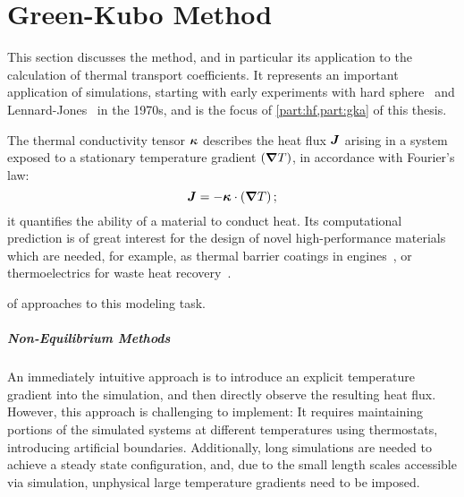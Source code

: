 
\chapter{Green-Kubo Method}
\label{ch:gk}

\noindent
This section discusses the  method, and in particular its application to the calculation of thermal transport coefficients. It represents an important application of \md simulations, starting with early experiments with hard sphere~\cite{agw1970t} and Lennard-Jones~\cite{v1967p} \ffs in the 1970s, and is the focus of \cref{part:hf,part:gka} of this thesis.

The thermal conductivity tensor $\boldsymbol{\kappa}$ describes the heat flux $\boldsymbol{J}$ arising in a system exposed to a stationary temperature gradient $(\boldsymbol{\nabla} T)$, in accordance with Fourier's law:
\begin{equation}
    \J = - \tk \cdot (\grad T) \, ;\label{eq:gk-fourier}
\end{equation}
it quantifies the ability of a material to conduct heat.
Its computational prediction is of great interest for the design of novel high-performance materials which are needed, for example, as thermal barrier coatings in engines~\cite{ecl2008t}, or thermoelectrics for waste heat recovery~\cite{st2008t}.


  of approaches to this modeling task.

\paragraph{Non-Equilibrium Methods} An immediately intuitive approach is to introduce an explicit temperature gradient into the simulation, and then directly observe the resulting heat flux. However, this approach is challenging to implement: It requires maintaining portions of the simulated systems at different temperatures using thermostats, introducing artificial boundaries. Additionally, long simulations are needed to achieve a steady state configuration, and, due to the small length scales accessible via simulation, unphysical large temperature gradients need to be imposed.~\cite{ssk2010t,m1997t,gkec2011t}

